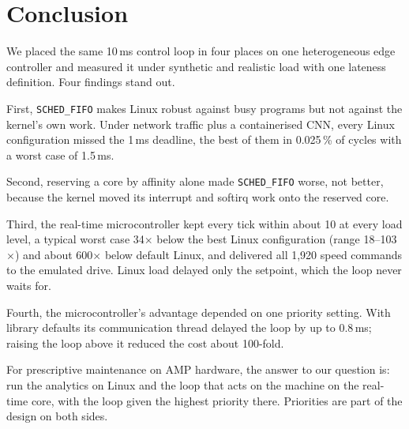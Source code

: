 \section{Conclusion}
\label{sec:conclusion}

We placed the same 10\,ms control loop in four places on one heterogeneous edge controller and measured it under synthetic and realistic load with one lateness definition. Four findings stand out.

First, \texttt{SCHED\_FIFO} makes Linux robust against busy programs but not against the kernel's own work. Under network traffic plus a containerised CNN, every Linux configuration missed the 1\,ms deadline, the best of them in 0.025\,\% of cycles with a worst case of 1.5\,ms.

Second, reserving a core by affinity alone made \texttt{SCHED\_FIFO} worse, not better, because the kernel moved its interrupt and softirq work onto the reserved core.

Third, the real-time microcontroller kept every tick within about 10\us{} at every load level, a typical worst case 34$\times$ below the best Linux configuration (range 18--103$\times$) and about 600$\times$ below default Linux, and delivered all 1{,}920 speed commands to the emulated drive. Linux load delayed only the setpoint, which the loop never waits for.

Fourth, the microcontroller's advantage depended on one priority setting. With library defaults its communication thread delayed the loop by up to 0.8\,ms; raising the loop above it reduced the cost about 100-fold.

For prescriptive maintenance on AMP hardware, the answer to our question is: run the analytics on Linux and the loop that acts on the machine on the real-time core, with the loop given the highest priority there. Priorities are part of the design on both sides.
